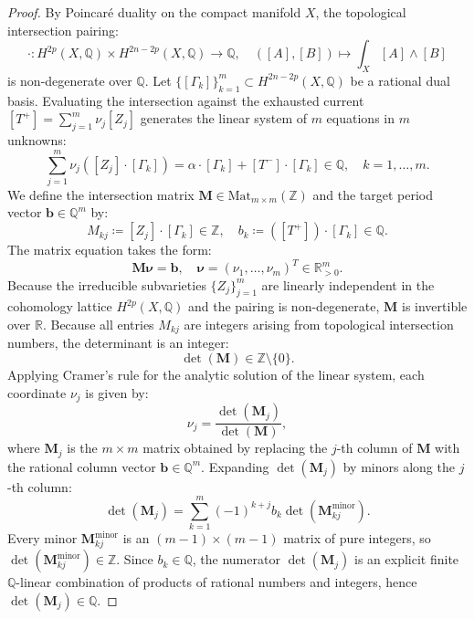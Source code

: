 \documentclass[11pt,a4paper]{article}
\theoremstyle{definition}
\theoremstyle{plain}
\begin{document}
\begin{proof}
By Poincaré duality on the compact manifold $X$, the topological intersection pairing:
\begin{equation}
    \label{eq:poincare_duality_pairing}
    \cdot : H^{2p}(X, \mathbb{Q}) \times H^{2n-2p}(X, \mathbb{Q}) \longrightarrow \mathbb{Q}, \quad ([A], [B]) \longmapsto \int_X [A] \wedge [B]
\end{equation}
is non-degenerate over $\mathbb{Q}$. Let $\{ [\Gamma_k] \}_{k=1}^m \subset H^{2n-2p}(X, \mathbb{Q})$ be a rational dual basis. Evaluating the intersection against the exhausted current $[T^+] = \sum_{j=1}^m \nu_j [Z_j]$ generates the linear system of $m$ equations in $m$ unknowns:
\begin{equation}
    \label{eq:rational_linear_system}
    \sum_{j=1}^m \nu_j \left( [Z_j] \cdot [\Gamma_k] \right) = \alpha \cdot [\Gamma_k] + [T^-] \cdot [\Gamma_k] \in \mathbb{Q}, \quad k = 1, \dots, m.
\end{equation}
We define the intersection matrix $\mathbf{M} \in \mathrm{Mat}_{m \times m}(\mathbb{Z})$ and the target period vector $\mathbf{b} \in \mathbb{Q}^m$ by:
\begin{equation}
    M_{kj} \coloneqq [Z_j] \cdot [\Gamma_k] \in \mathbb{Z}, \quad b_k \coloneqq ([T^+]) \cdot [\Gamma_k] \in \mathbb{Q}.
\end{equation}
The matrix equation takes the form:
\begin{equation}
    \label{eq:matrix_system_lelong}
    \mathbf{M} \boldsymbol{\nu} = \mathbf{b}, \quad \boldsymbol{\nu} = (\nu_1, \dots, \nu_m)^T \in \mathbb{R}_{>0}^m.
\end{equation}
Because the irreducible subvarieties $\{Z_j\}_{j=1}^m$ are linearly independent in the cohomology lattice $H^{2p}(X, \mathbb{Q})$ and the pairing is non-degenerate, $\mathbf{M}$ is invertible over $\mathbb{R}$. Because all entries $M_{kj}$ are integers arising from topological intersection numbers, the determinant is an integer:
\begin{equation}
    \det(\mathbf{M}) \in \mathbb{Z} \setminus \{0\}.
\end{equation}
Applying Cramer's rule for the analytic solution of the linear system, each coordinate $\nu_j$ is given by:
\begin{equation}
    \label{eq:cramer_explicit_formula}
    \nu_j = \frac{\det(\mathbf{M}_j)}{\det(\mathbf{M})},
\end{equation}
where $\mathbf{M}_j$ is the $m \times m$ matrix obtained by replacing the $j$-th column of $\mathbf{M}$ with the rational column vector $\mathbf{b} \in \mathbb{Q}^m$. Expanding $\det(\mathbf{M}_j)$ by minors along the $j$-th column:
\begin{equation}
    \det(\mathbf{M}_j) = \sum_{k=1}^m (-1)^{k+j} b_k \det(\mathbf{M}_{kj}^{\mathrm{minor}}).
\end{equation}
Every minor $\mathbf{M}_{kj}^{\mathrm{minor}}$ is an $(m-1) \times (m-1)$ matrix of pure integers, so $\det(\mathbf{M}_{kj}^{\mathrm{minor}}) \in \mathbb{Z}$. Since $b_k \in \mathbb{Q}$, the numerator $\det(\mathbf{M}_j)$ is an explicit finite $\mathbb{Q}$-linear combination of products of rational numbers and integers, hence $\det(\mathbf{M}_j) \in \mathbb{Q}$.


\end{proof}
\end{document}
